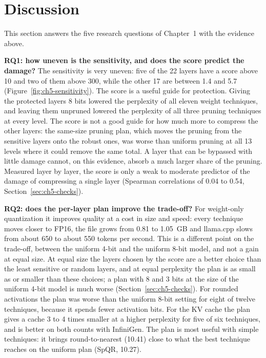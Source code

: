 \documentclass[
11pt, %
english, %
singlespacing, %
headsepline, %
]{MastersDoctoralThesis} %
\begin{document}
\section{Discussion}
\label{sec:ch5-discussion}

This section answers the five research questions of Chapter~1 with the evidence above.

\textbf{RQ1: how uneven is the sensitivity, and does the score predict the damage?} The sensitivity is very uneven: five of the 22 layers have a score above 10 and two of them above 300, while the other 17 are between 1.4 and 5.7 (Figure~\ref{fig:ch5-sensitivity}). The score is a useful guide for protection. Giving the protected layers 8 bits lowered the perplexity of all eleven weight techniques, and leaving them unpruned lowered the perplexity of all three pruning techniques at every level. The score is not a good guide for how much more to compress the other layers: the same-size pruning plan, which moves the pruning from the sensitive layers onto the robust ones, was worse than uniform pruning at all 13 levels where it could remove the same total. A layer that can be bypassed with little damage cannot, on this evidence, absorb a much larger share of the pruning. Measured layer by layer, the score is only a weak to moderate predictor of the damage of compressing a single layer (Spearman correlations of 0.04 to 0.54, Section~\ref{sec:ch5-checks}).

\textbf{RQ2: does the per-layer plan improve the trade-off?} For weight-only quantization it improves quality at a cost in size and speed: every technique moves closer to FP16, the file grows from 0.81 to 1.05~GB and llama.cpp slows from about 650 to about 550 tokens per second. This is a different point on the trade-off, between the uniform 4-bit and the uniform 8-bit model, and not a gain at equal size. At equal size the layers chosen by the score are a better choice than the least sensitive or random layers, and at equal perplexity the plan is as small as or smaller than these choices; a plan with 8 and 3 bits at the size of the uniform 4-bit model is much worse (Section~\ref{sec:ch5-checks}). For rounded activations the plan was worse than the uniform 8-bit setting for eight of twelve techniques, because it spends fewer activation bits. For the KV cache the plan gives a cache 3 to 4 times smaller at a higher perplexity for five of six techniques, and is better on both counts with InfiniGen. The plan is most useful with simple techniques: it brings round-to-nearest (10.41) close to what the best technique reaches on the uniform plan (SpQR, 10.27).
\end{document}
